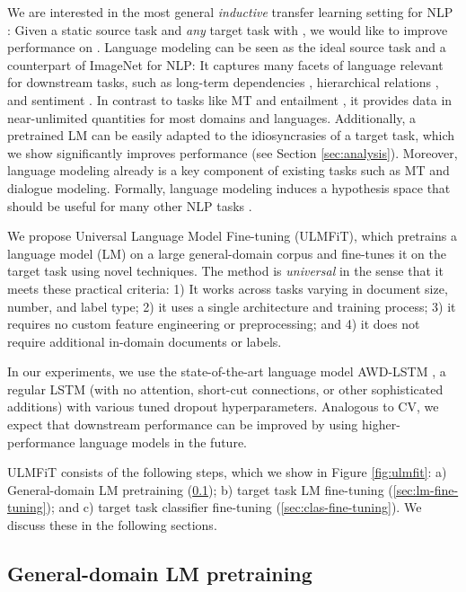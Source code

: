 \documentclass[11pt,a4paper]{article}
\begin{document}
We are interested in the most general \emph{inductive} transfer learning setting for NLP \cite{Pan2010}: Given a static source task  and \emph{any} target task  with , we would like to improve performance on . Language modeling can be seen as the ideal source task and a counterpart of ImageNet for NLP: It captures many facets of language relevant for downstream tasks, such as long-term dependencies \cite{linzen2016assessing}, hierarchical relations \cite{Gulordava2018}, and sentiment \cite{radford2017learning}. In contrast to tasks like MT \cite{Mccann2017} and entailment \cite{Conneau2017}, it provides data in near-unlimited quantities for most domains and languages. Additionally, a pretrained LM can be easily adapted to the idiosyncrasies of a target task, which we show significantly improves performance (see Section \ref{sec:analysis}). Moreover, language modeling already is a key component of existing tasks such as MT and dialogue modeling. Formally, language modeling induces a hypothesis space  that should be useful for many other NLP tasks \cite{vapnik1982estimation,Baxter2000}. 

We propose Universal Language Model Fine-tuning (ULMFiT), which pretrains a language model (LM) on a large general-domain corpus and fine-tunes it on the target task using novel techniques. The method is \emph{universal} in the sense that it meets these practical criteria: 1) It works across tasks varying in document size, number, and label type; 2) it uses a single architecture and training process; 3) it requires no custom feature engineering or preprocessing; and 4) it does not require additional in-domain documents or labels.

In our experiments, we use the state-of-the-art language model AWD-LSTM \cite{Merity2017}, a regular LSTM (with no attention, short-cut connections, or other sophisticated additions) with various tuned dropout hyperparameters. Analogous to CV, we expect that downstream performance can be improved by using higher-performance language models in the future.

ULMFiT consists of the following steps, which we show in Figure \ref{fig:ulmfit}: a) General-domain LM pretraining (\textsection \ref{sec:pretraining}); b) target task LM fine-tuning (\textsection \ref{sec:lm-fine-tuning}); and c) target task classifier fine-tuning (\textsection \ref{sec:clas-fine-tuning}). We discuss these in the following sections.

\subsection{General-domain LM pretraining} \label{sec:pretraining}
\end{document}
